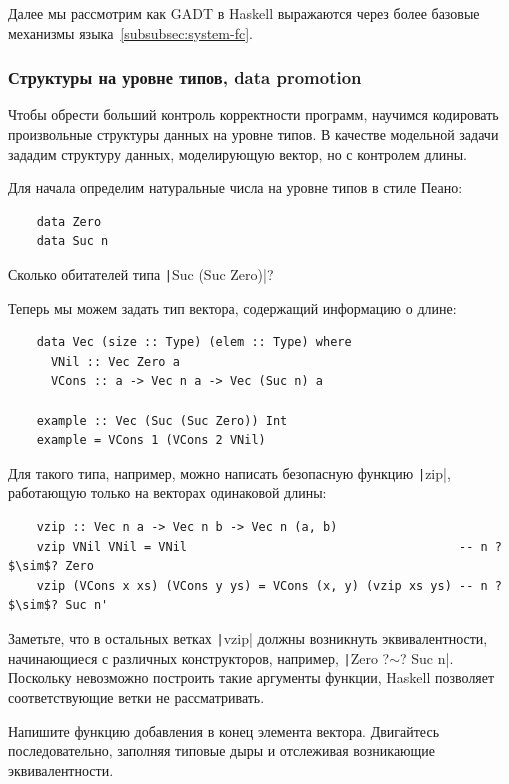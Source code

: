 Далее мы рассмотрим как GADT в Haskell выражаются через более базовые механизмы языка~\ref{subsubsec:system-fc}.

\subsubsection{Структуры на уровне типов, data promotion} \label{subsubsec:promotion}

Чтобы обрести больший контроль корректности программ, научимся кодировать произвольные структуры данных на уровне типов.
В качестве модельной задачи зададим структуру данных, моделирующую вектор, но с контролем длины.

Для начала определим натуральные числа на уровне типов в стиле Пеано:
\begin{verbatim}
    data Zero
    data Suc n
\end{verbatim}

\begin{task}
    Сколько обитателей типа \texttt|Suc (Suc Zero)|?
\end{task}

Теперь мы можем задать тип вектора, содержащий информацию о длине:
\begin{verbatim}
    data Vec (size :: Type) (elem :: Type) where
      VNil :: Vec Zero a
      VCons :: a -> Vec n a -> Vec (Suc n) a

    example :: Vec (Suc (Suc Zero)) Int
    example = VCons 1 (VCons 2 VNil)
\end{verbatim}

Для такого типа, например, можно написать безопасную функцию \texttt|zip|, работающую только на векторах одинаковой длины:
\begin{verbatim}
    vzip :: Vec n a -> Vec n b -> Vec n (a, b)
    vzip VNil VNil = VNil                                      -- n ?$\sim$? Zero
    vzip (VCons x xs) (VCons y ys) = VCons (x, y) (vzip xs ys) -- n ?$\sim$? Suc n'
\end{verbatim}

Заметьте, что в остальных ветках \texttt|vzip| должны возникнуть эквивалентности, начинающиеся с различных конструкторов, например, \texttt|Zero ?$\sim$? Suc n|.
Поскольку невозможно построить такие аргументы функции, Haskell позволяет соответствующие ветки не рассматривать.

\begin{task}
    Напишите функцию добавления в конец элемента вектора.
    Двигайтесь последовательно, заполняя типовые дыры и отслеживая возникающие эквивалентности.
\end{task}

